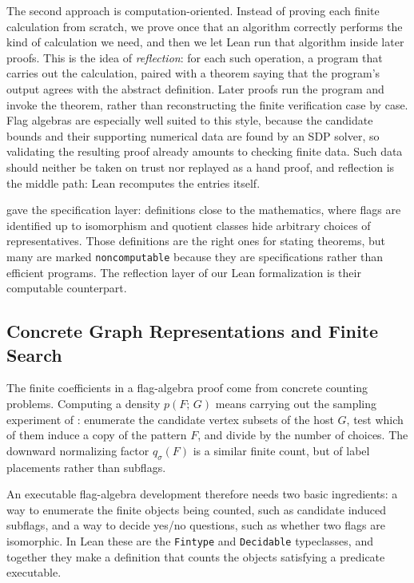 \documentclass[acmsmall,screen=true,acmthm=false]{acmart}
\newcommand{\den}[2]{p(#1;\,#2)}
\DeclareRobustCommand{\lean}[1]{{\def\_{\textunderscore\allowbreak}\texttt{#1}}}
\begin{document}
The second approach is computation-oriented.  Instead of proving each finite
calculation from scratch, we prove once that an algorithm correctly performs the
kind of calculation we need, and then we let Lean run that algorithm inside later
proofs.  This is the idea of \emph{reflection}: for each such operation, a
program that carries out the calculation, paired with a theorem saying that the
program's output agrees with the abstract definition.  Later proofs run the
program and invoke the theorem, rather than reconstructing the finite
verification case by case.  Flag algebras are especially well suited to this
style, because the candidate bounds and their supporting numerical data are
found by an SDP solver, so validating the resulting proof already amounts to
checking finite data.  Such data should
neither be taken on trust nor replayed as a hand proof, and reflection is the
middle path: Lean recomputes the entries itself.

 gave the specification layer: definitions close to the
mathematics, where flags are identified up to isomorphism and quotient classes
hide arbitrary choices of representatives.  Those definitions are the right ones
for stating theorems, but many are marked \lean{noncomputable} because they are
specifications rather than efficient programs.  The reflection layer of our Lean
formalization is their computable counterpart.

\subsection{Concrete Graph Representations and Finite Search}
\label{sec:reflection-concrete}

The finite coefficients in a flag-algebra proof come from concrete counting
problems.  Computing a density \(\den{F}{G}\) means carrying out the sampling
experiment of : enumerate the candidate vertex
subsets of the host \(G\), test which of them induce a copy of the pattern
\(F\), and divide by the number of choices.  The downward normalizing factor
\(q_\sigma(F)\) is a similar finite count, but of label placements rather than
subflags.

An executable flag-algebra development therefore needs two basic ingredients: a
way to enumerate the finite objects being counted, such as candidate induced
subflags, and a way to decide yes/no questions, such as whether two flags are
isomorphic.  In Lean these are the \lean{Fintype} and \lean{Decidable}
typeclasses, and together they make a definition that counts the objects
satisfying a predicate executable.
\end{document}
